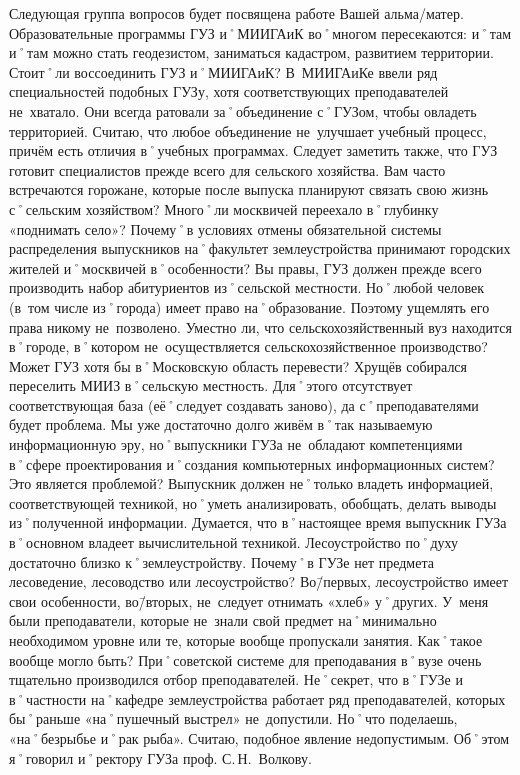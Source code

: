 \begin{drama}
	\maxspeaks Следующая группа вопросов будет посвящена работе Вашей альма\-/матер. Образовательные программы ГУЗ и˚МИИГАиК во˚многом пересекаются: и˚там и˚там можно стать геодезистом, заниматься кадастром, развитием территории. Стоит˚ли воссоединить ГУЗ и˚МИИГАиК? 
	\michaelspeaks В~МИИГАиКе ввели ряд специальностей подобных ГУЗу, хотя соответствующих преподавателей не~хватало. Они всегда ратовали за˚объединение с˚ГУЗом, чтобы овладеть территорией. Считаю, что любое объединение не~улучшает учебный процесс, причём есть отличия в˚учебных программах. Следует заметить также, что ГУЗ готовит специалистов прежде всего для сельского хозяйства.
	\maxspeaks Вам часто встречаются горожане, которые после выпуска планируют связать свою жизнь с˚сельским хозяйством? Много˚ли москвичей переехало в˚глубинку  «поднимать село»? Почему˚в условиях отмены обязательной системы распределения выпускников на˚факультет землеустройства принимают городских жителей и˚москвичей в˚особенности? 
	\michaelspeaks Вы правы, ГУЗ должен прежде всего производить набор абитуриентов из˚сельской местности. Но˚любой человек (в~том числе из˚города) имеет право на˚образование. Поэтому ущемлять его права никому не~позволено. 
	\maxspeaks Уместно ли, что сельскохозяйственный вуз находится в˚городе, в˚котором не~осуществляется сельскохозяйственное производство? Может ГУЗ хотя бы в˚Московскую область перевести?
	\michaelspeaks Хрущёв собирался переселить МИИЗ в˚сельскую местность. Для˚этого отсутствует соответствующая база (её˚следует создавать заново), да с˚преподавателями будет проблема.
	\maxspeaks Мы уже достаточно долго живём в˚так называемую информационную эру, но˚выпускники ГУЗа не~обладают компетенциями в˚сфере проектирования и˚создания компьютерных информационных систем? Это является проблемой?
	\michaelspeaks Выпускник должен не˚только владеть информацией, соответствующей техникой, но˚уметь анализировать, обобщать, делать выводы из˚полученной информации. Думается, что в˚настоящее время выпускник ГУЗа в˚основном владеет вычислительной техникой.
	\maxspeaks Лесоустройство по˚духу достаточно близко к˚землеустройству. Почему˚в ГУЗе нет предмета лесоведение, лесоводство или лесоустройство?
	\michaelspeaks Во\=/первых, лесоустройство имеет свои особенности, во\=/вторых, не~следует отнимать «хлеб» у˚других.
	\maxspeaks У~меня были преподаватели, которые не~знали свой предмет на˚минимально необходимом уровне или те, которые вообще пропускали занятия. Как˚такое вообще могло быть? 
	\michaelspeaks При˚советской системе для преподавания в˚вузе очень тщательно производился отбор преподавателей. Не˚секрет, что в˚ГУЗе и в˚частности на˚кафедре землеустройства работает ряд преподавателей, которых бы˚раньше «на˚пушечный выстрел» не~допустили. Но˚что поделаешь, «на˚безрыбье и˚рак рыба». Считаю, подобное явление недопустимым. Об˚этом я˚говорил и˚ректору ГУЗа проф. С.\,Н.~Волкову.

\end{drama}
